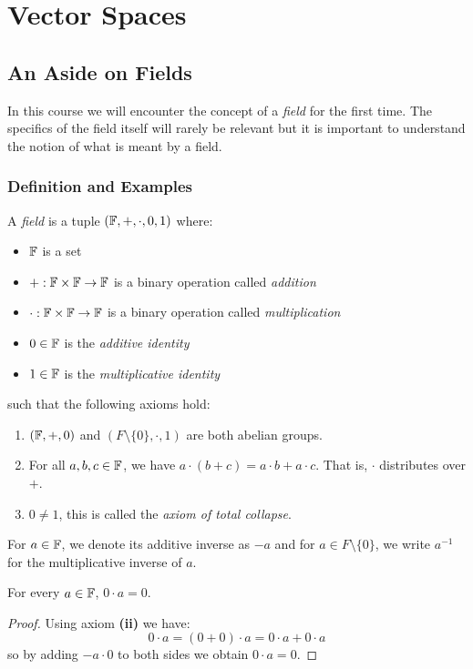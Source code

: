 \documentclass[../main.tex]{subfiles}
\begin{document}
\chapter{Vector Spaces}
\section{An Aside on Fields}
In this course we will encounter the concept of a \textit{field} for the first time.
The specifics of the field itself will rarely be relevant but it is important to understand the notion of what is meant by a field.
\subsection{Definition and Examples}
\begin{definition}[Field]
  A \textit{field} is a tuple $(\mathbb{F}, +, \cdot, 0, 1)$ where:
  \begin{itemize}
    \item $\mathbb{F}$ is a set
    \item $+: \mathbb{F} \times \mathbb{F} \to \mathbb{F}$ is a binary operation called \textit{addition}
    \item $\cdot: \mathbb{F} \times \mathbb{F} \to \mathbb{F}$ is a binary operation called \textit{multiplication}
    \item $0 \in \mathbb{F}$ is the \textit{additive identity}
    \item $1 \in \mathbb{F}$ is the \textit{multiplicative identity}
  \end{itemize}
  such that the following axioms hold:
  \begin{enumerate}
    \item $(\mathbb{F}, +, 0)$ and $(F \setminus \{0\}, \cdot, 1)$ are both abelian groups.
    \item For all $a, b, c \in \mathbb{F}$, we have $a \cdot (b + c) = a \cdot b + a \cdot c$.
      That is, $\cdot$ distributes over $+$.
    \item $0 \neq 1$, this is called the \textit{axiom of total collapse}.
  \end{enumerate}
\end{definition}
\begin{remark}[Notation]
  For $a \in \mathbb{F}$, we denote its additive inverse as $-a$ and for $a \in F \setminus \{0\}$, we write $a^{-1}$ for the multiplicative inverse of $a$.
\end{remark}
\begin{lemma}
  For every $a \in \mathbb{F}$, $0 \cdot a = 0$. \label{fieldLemma}
\end{lemma}
\begin{proof}
  Using axiom \textbf{(ii)} we have:
  \[
    0 \cdot a = (0 + 0) \cdot a = 0 \cdot a + 0 \cdot a
  \]
  so by adding $-a \cdot 0$ to both sides we obtain $0 \cdot a = 0$.
\end{proof}
\end{document}
